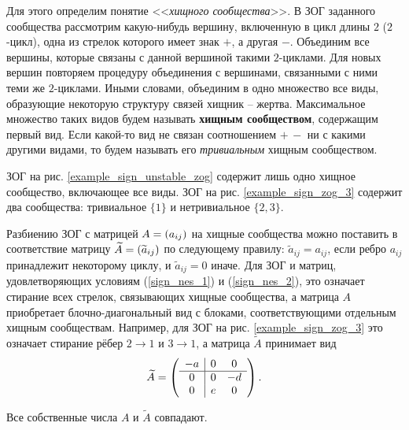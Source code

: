     Для этого определим понятие <<\textit{хищного сообщества}>>. В ЗОГ заданного сообщества рассмотрим какую-нибудь вершину, включенную в цикл длины $2$ ($2$-цикл), одна из стрелок которого имеет знак \(+\), а другая \(-\). Объединим все вершины, которые связаны с данной вершиной такими \(2\)-циклами. Для новых вершин повторяем процедуру объединения с вершинами, связанными с ними теми же \(2\)-циклами. Иными словами, объединим в одно множество все виды, образующие некоторую структуру связей хищник -- жертва. Максимальное множество таких видов будем называть \textbf{хищным сообществом}, содержащим первый вид. Если какой-то вид не связан соотношением \(+ \, -\) ни с какими другими видами, то будем называть его \textit{тривиальным} хищным сообществом.

    ЗОГ на рис. \ref{example_sign_unstable_zog} содержит лишь одно хищное сообщество, включающее все виды. ЗОГ на рис. \ref{example_sign_zog_3} содержит два сообщества: тривиальное \(\{1\}\) и нетривиальное \(\{2,3\}\).

    Разбиению ЗОГ с матрицей \(A = \left(  a_{ij}  \right) \) на хищные сообщества можно поставить в соответствие матрицу \(\widetilde{A} = \left(  \widetilde{a}_{ij}  \right) \) по следующему правилу: \(\widetilde{a}_{ij} = a_{ij}\), если ребро \(a_{ij}\) принадлежит некоторому циклу, и \(\widetilde{a}_{ij} = 0\) иначе. Для ЗОГ и матриц, удовлетворяющих условиям (\ref{sign_nes_1}) и (\ref{sign_nes_2}), это означает стирание всех стрелок, связывающих хищные сообщества, а матрица \(A\) приобретает блочно-диагональный вид с блоками, соответствующими отдельным хищным сообществам. Например, для ЗОГ на рис. \ref{example_sign_zog_3} это означает стирание рёбер \(2 \to 1\) и \(3 \to 1\), а матрица \(\widetilde{A}\) принимает вид
    \begin{equation*}
        \widetilde{A} = \left(  \begin{array}{c|cc}
            -a & 0 & 0 \\ \hline
            0 & 0 & -d \\
            0 & e & 0 
        \end{array}  \right).
    \end{equation*}

    \begin{lemma} \label{lemma_a_tilde_a}
        Все собственные числа \(A\) и \(\widetilde{A}\) совпадают.
    \end{lemma}

